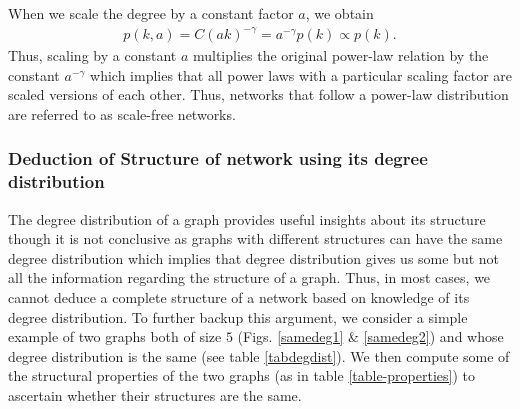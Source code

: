 \documentclass[10pt,a4paper]{article}
\begin{document}
When we scale the degree by a constant factor $a$, we obtain
\begin{eqnarray}
p(k,a) = C(ak)^{-\gamma} = a^{-\gamma} p(k) \propto p(k).
\label{scale}
\end{eqnarray}
Thus, scaling by a constant $a$ multiplies the original power-law relation by the constant $a^{-\gamma}$ which implies that all power laws with a particular scaling factor are scaled versions of each other. Thus, networks that follow a power-law distribution are referred to as scale-free networks.

\subsubsection{Deduction of Structure of network using its degree distribution}
The degree distribution of a graph provides useful insights about its structure though it is not conclusive as 
graphs with different structures can have the same degree distribution which implies that degree distribution gives us some but not all the information regarding the structure
of a graph. Thus, in most cases, we cannot deduce a complete structure of a network based on knowledge of
its degree distribution. To further backup this argument, we consider a simple example of two graphs both of size $5$ (Figs. \ref{samedeg1} \& \ref{samedeg2}) and whose degree distribution is the same (see table \ref{tabdegdist}). We then compute some of the structural properties of the two graphs (as in table \ref{table-properties}) to ascertain whether their structures are the same.
\end{document}
